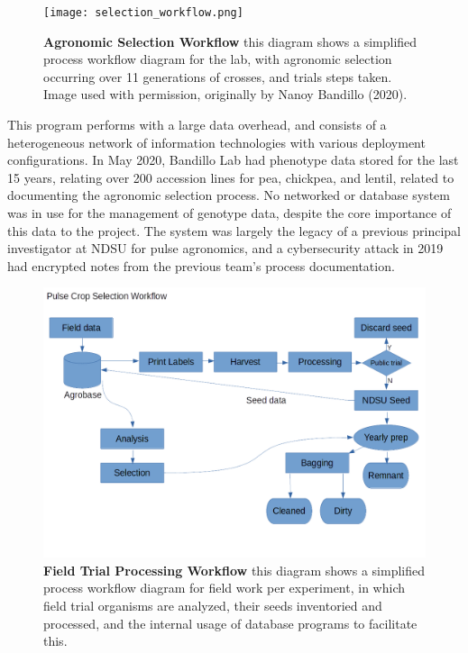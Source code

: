 \documentclass[12pt, letterpaper,oneocolumn]{article}
\begin{document}
	\begin{center}
		\begin{figure}[H]
			\texttt{[image: selection\_workflow.png]}
			\caption{\textbf{Agronomic Selection Workflow} this diagram shows a simplified process workflow diagram for the lab, with agronomic selection occurring over 11 generations of crosses, and trials steps taken. Image used with permission, originally by Nanoy Bandillo (2020).
}
		\end{figure}
	\end{center}

	This program performs with a large data overhead, and consists of a heterogeneous network of information technologies with various deployment configurations. In May 2020, Bandillo Lab had phenotype data stored for the last 15 years, relating over 200 accession lines for pea, chickpea, and lentil, related to documenting the agronomic selection process. No networked or database system was in use for the management of genotype data, despite the core importance of this data to the project. The system was largely the legacy of a previous principal investigator at NDSU for pulse agronomics, and a cybersecurity attack in 2019 had encrypted notes from the previous team's process documentation.

\begin{center}
	\begin{figure}[H]
			\includegraphics[width=\linewidth]{processing_workflow.png}
			\caption{\textbf{Field Trial Processing Workflow} this diagram shows a simplified process workflow diagram for field work per experiment, in which field trial organisms are analyzed, their seeds inventoried and processed, and the internal usage of database programs to facilitate this.}
		\end{figure}
		\end{center}
\end{document}
